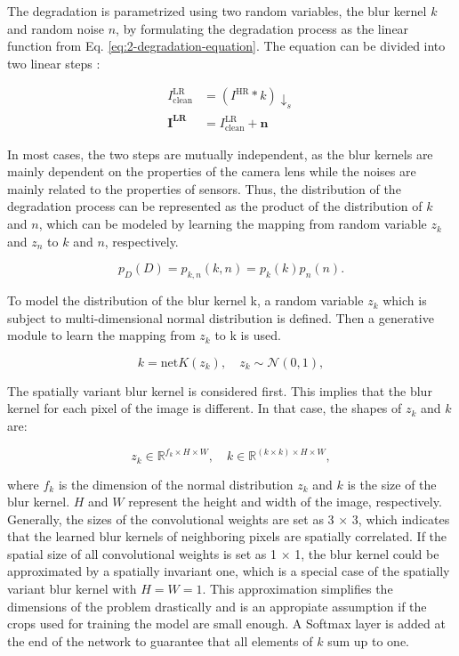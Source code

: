     The degradation is parametrized using two random variables, the blur kernel $k$ and random noise $n$, by formulating the degradation process as the linear function from Eq. \ref{eq:2-degradation-equation}.
    The equation can be divided into two linear steps \cite{zhu2020unpaired}: 

    \begin{equation}
        \begin{aligned}
                I^{\text{LR}}_{\text{clean}} &= (I^{\text{HR}} * k) \downarrow_s \\
                \mathbf{I^{\text{LR}}} &= I^{\text{LR}}_{\text{clean}} + \mathbf{n}
        \end{aligned}
    \end{equation}
    
    In most cases, the two steps are mutually independent, as the blur kernels are mainly dependent on the properties of the camera lens while the noises are mainly related to the properties of sensors. 
    Thus, the distribution of the degradation process can be represented as the product of the distribution of $k$ and $n$, which can be modeled by learning the mapping from random variable $z_k$ and $z_n$ to $k$ and $n$, respectively.


    \begin{equation}
        p_{D}(D) = p_{k,n}(k, n) = p_{k}(k)p_{n}(n).
    \end{equation}

    To model the distribution of the blur kernel k, a random variable $z_k$ which is subject to multi-dimensional normal distribution is defined. 
    Then a generative module to learn the mapping from $z_k$ to k is used. 

    \begin{equation}
        k = \text{net}K(z_k), \quad z_k \sim \mathcal{N}(0,1),
    \end{equation}

    The spatially variant blur kernel is considered first. This implies that the blur kernel for each pixel of the image is different. In that case, the shapes of $z_k$ and $k$ are:

    \begin{equation}
        z_k \in \mathbb{R}^{f_k \times H \times W}, \quad k \in \mathbb{R}^{(k \times k) \times H \times W},
    \end{equation}

    where $f_k$ is the dimension of the normal distribution $z_k$ and $k$ is the size of the blur kernel. $H$ and $W$ represent the height and width of the image, respectively.
    Generally, the sizes of the convolutional weights are set as 3 × 3, which indicates that the learned blur kernels of neighboring pixels are spatially correlated.
    If the spatial size of all convolutional weights is set as 1 × 1, the blur kernel could be approximated by a spatially invariant one, which is a special case of the spatially variant blur kernel with $H = W = 1$.
    This approximation simplifies the dimensions of the problem drastically and is an appropiate assumption if the crops used for training the model are small enough.
    A Softmax layer is added at the end of the network to guarantee that all elements of $k$ sum up to one.
    
